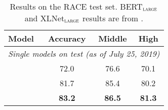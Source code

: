 \begin{table}[t]
\begin{center}
\begin{tabular}{lccc}
\toprule
\bf Model & \bf Accuracy & \bf Middle & \bf High \\
\midrule
\multicolumn{4}{l}{\textit{Single models on test (as of July 25, 2019)}}\\
\bertlarge{} &  72.0 & 76.6 & 70.1 \\
\xlnetlarge{} & 81.7 & 85.4 & 80.2 \\
\midrule
\ourmodel{} & \bf{83.2} &  \bf{86.5} & \bf{81.3}\\
\bottomrule
\end{tabular}
\end{center}
\caption{Results on the RACE test set. BERT$_{\textsc{large}}$ and XLNet$_{\textsc{large}}$ results are from .}
\label{tab:roberta_race}
\end{table}

